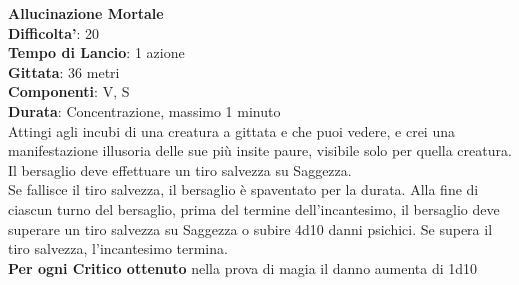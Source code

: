\begin{multicols}{2}
\medskip\textbf{Allucinazione Mortale}\\
\textbf{Difficolta'}: 20\\
\textbf{Tempo di Lancio}: 1 azione\\
\textbf{Gittata}: 36 metri\\
\textbf{Componenti}: V, S\\
\textbf{Durata}: Concentrazione, massimo 1 minuto\\
Attingi agli incubi di una creatura a gittata e che puoi vedere, e crei una manifestazione illusoria delle sue più insite paure, visibile solo per quella creatura. Il bersaglio deve effettuare un tiro salvezza su Saggezza.\\
Se fallisce il tiro salvezza, il bersaglio è spaventato per la durata. Alla fine di ciascun turno del bersaglio, prima del termine dell’incantesimo, il bersaglio deve superare un tiro salvezza su Saggezza o subire 4d10 danni psichici. Se supera il tiro salvezza, l’incantesimo termina.\\
\textbf{Per ogni Critico ottenuto} nella prova di magia il danno aumenta di 1d10


\end{multicols}
